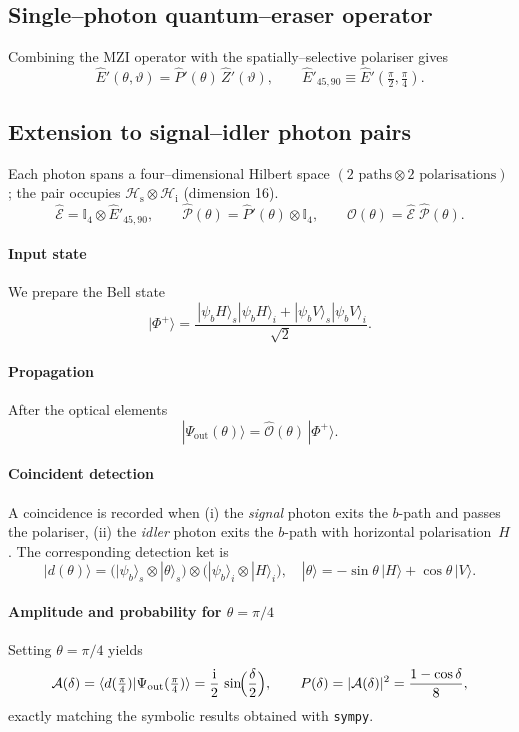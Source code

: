 \documentclass{article}
\begin{document}
\subsection*{Single--photon quantum–eraser operator}

Combining the MZI operator with the spatially–selective polariser gives
\[
\hat{E}'(\theta,\vartheta)=\hat{P}'(\theta)\,\hat{Z}'(\vartheta),
\qquad
\hat{E}'_{45,90}\equiv
\hat{E}'\!\left(\tfrac{\pi}{2},\tfrac{\pi}{4}\right).
\]

\subsection*{Extension to signal–idler photon pairs}

Each photon spans a four–dimensional Hilbert space
\((2\text{ paths}\otimes 2\text{ polarisations})\);               
the pair occupies
\(\mathcal{H}_{\mathrm{s}}\otimes\mathcal{H}_{\mathrm{i}}\) (dimension 16).
\[
\hat{\mathcal{E}}=
\mathbb{I}_{4}\otimes\hat{E}'_{45,90},\qquad
\hat{\mathcal{P}}(\theta)=\hat{P}'(\theta)\otimes\mathbb{I}_{4},\qquad
\hat{\mathcal{O}}(\theta)=\hat{\mathcal{E}}\;\hat{\mathcal{P}}(\theta).
\]

\paragraph{Input state}

We prepare the Bell state
\[
|\Phi^{+}\rangle=
\frac{\,|\psi_bH\rangle_{\!s}|\psi_bH\rangle_{\!i}
      +|\psi_bV\rangle_{\!s}|\psi_bV\rangle_{\!i}}{\sqrt{2}}.
\]

\paragraph{Propagation}

After the optical elements
\[
|\Psi_{\mathrm{out}}(\theta)\rangle
=\hat{\mathcal{O}}(\theta)\,|\Phi^{+}\rangle.
\]

\paragraph{Coincident detection}

A coincidence is recorded when
(i) the \emph{signal} photon exits the \(b\)-path and passes the polariser,
(ii) the \emph{idler} photon exits the \(b\)-path with horizontal polarisation~\(H\).
The corresponding detection ket is
\[
|d(\theta)\rangle=
\bigl(|\psi_b\rangle_{\!s}\otimes|{\theta}\rangle_{\!s}\bigr)
\otimes
\bigl(|\psi_b\rangle_{\!i}\otimes|H\rangle_{\!i}\bigr),
\quad
|{\theta}\rangle=-\sin\theta\,|H\rangle+\cos\theta\,|V\rangle.
\]

\paragraph{Amplitude and probability for \(\theta=\pi/4\)}

Setting \(\theta=\pi/4\) yields
\[
\mathcal{A}(\delta)=
\langle d(\tfrac{\pi}{4})|
      \Psi_{\mathrm{out}}(\tfrac{\pi}{4})\rangle
      =\frac{\mathrm{i}}{2}\,
        \sin\!\Bigl(\frac{\delta}{2}\Bigr),
\qquad
P(\delta)=|\mathcal{A}(\delta)|^{2}
        =\frac{1-\cos\delta}{8},
\]
exactly matching the symbolic results obtained with \texttt{sympy}.
\end{document}
